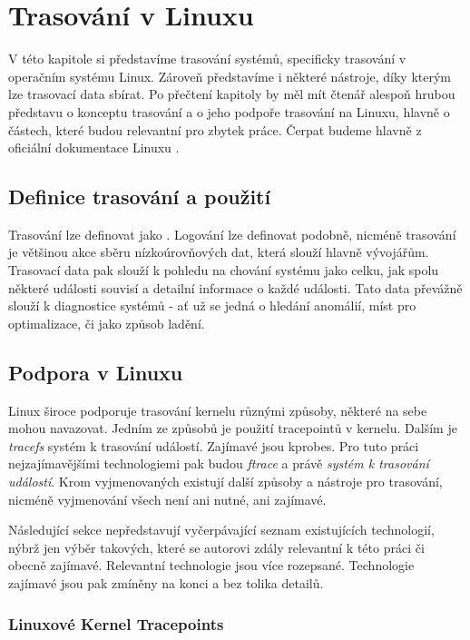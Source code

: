 \chapter{Trasování v Linuxu}

V této kapitole si představíme trasování systémů, specificky trasování v operačním systému Linux. Zároveň představíme i některé nástroje, díky kterým lze trasovací data sbírat. Po přečtení kapitoly by měl mít čtenář alespoň hrubou představu o konceptu trasování a o jeho podpoře trasování na Linuxu, hlavně o částech, které budou relevantní pro zbytek práce. Čerpat budeme hlavně z oficiální dokumentace Linuxu \cite{Linux-Tracing}.

\section{Definice trasování a použití}

Trasování lze definovat jako . Logování lze definovat podobně, nicméně trasování je většinou akce sběru nízkoúrovňových dat, která slouží hlavně vývojářům. Trasovací data pak slouží k pohledu na chování systému jako celku, jak spolu některé události souvisí a detailní informace o každé události. Tato data převážně slouží k diagnostice systémů - ať už se jedná o hledání anomálií, míst pro optimalizace, či jako způsob ladění.

\section{Podpora v Linuxu}

Linux široce podporuje trasování kernelu různými způsoby, některé na sebe mohou navazovat. Jedním ze způsobů je použití tracepointů v kernelu. Dalším je \emph{tracefs} systém k trasování událostí. Zajímavé jsou kprobes. Pro tuto práci nejzajímavějšími technologiemi pak budou \emph{ftrace} a právě \emph{systém k trasování událostí}. Krom vyjmenovaných existují další způsoby a nástroje pro trasování, nicméně vyjmenování všech není ani nutné, ani zajímavé.

Následující sekce nepředstavují vyčerpávající seznam existujících technologií, nýbrž jen výběr takových, které se autorovi zdály relevantní k této práci či obecně zajímavé. Relevantní technologie jsou více rozepsané. Technologie zajímavé jsou pak zmíněny na konci a bez tolika detailů.

\subsection{Linuxové Kernel Tracepoints}
\label{tracepoints}

